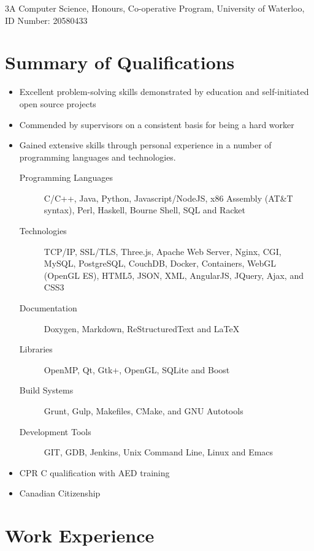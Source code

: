 \documentclass[11pt,letterpaper]{moderncv}
\newenvironment{coverletter}[2][Recruitment team]{%
  \recipient{#1}{#2}%
  \opening{Dear Sir or Madam,}%
  \closing{Sincerely,}%
  \enclosure{R\'esum\'e}%
  \makelettertitle%
}{%
  \makeletterclosing%
  \clearpage%
}
\begin{document}
\newif\ifincludeletter
\ifincludeletter
\begin{coverletter}{Company, Inc.\\123 somestreet\\some city}
  \lipsum[1-3]
\end{coverletter}
\fi

\makecvtitle

3A Computer Science, Honours, Co-operative Program, University of
Waterloo, ID Number: 20580433

\section{Summary of Qualifications}

\begin{itemize}
\item Excellent problem-solving skills demonstrated by education
  and self-initiated open source projects
\item Commended by supervisors on a consistent basis for being a hard
  worker
\item Gained extensive skills through personal experience in a number
  of programming languages and technologies.
  \begin{description}
  \item[Programming Languages] C/C++, Java, Python, Javascript/NodeJS,
    x86 Assembly (AT\&T syntax), Perl, Haskell, Bourne Shell, SQL and
    Racket
  \item[Technologies] TCP/IP, SSL/TLS, Three.js, Apache Web Server,
    Nginx, CGI, MySQL, PostgreSQL, CouchDB, Docker, Containers, WebGL
    (OpenGL ES), HTML5, JSON, XML, AngularJS, JQuery, Ajax, and CSS3
  \item[Documentation] Doxygen, Markdown, ReStructuredText and \LaTeX{}
  \item[Libraries] OpenMP, Qt, Gtk+, OpenGL, SQLite and Boost
  \item[Build Systems] Grunt, Gulp, Makefiles, CMake, and GNU Autotools
  \item[Development Tools] GIT, GDB, Jenkins, Unix Command Line, Linux
    and Emacs
  \end{description}
\item CPR C qualification with AED training
\item Canadian Citizenship
\end{itemize}

\section{Work Experience}
\end{document}
